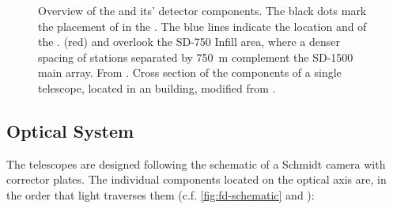 \begin{figure}[t]
  \centering
  \hspace{0.2cm}
  \caption[]{ Overview of the \PAO and its' detector 
  components. The black dots mark the placement of \WCDs in the \SD. The blue 
  lines indicate the location and \FOV of the \FDs. \HE (red) and \CO overlook 
  the SD-750 Infill area, where a denser spacing of stations separated by 
  \SI{750}{\meter} complement the SD-1500 main array. From 
  \cite{vebericIndexHttpWebiapkitedu}.  Cross section 
  of the components of a single telescope, located in an \FD building, modified 
  from \cite{abraham_fluorescence_2010}.}
  \label{fig:pao-images}
\end{figure}


\subsection{Optical System}
\label{ssec:fd-design}

The \FD telescopes are designed following the schematic of a Schmidt camera with 
corrector plates. The individual components located on the optical axis are, in 
the order that light traverses them (c.f. \cref{fig:fd-schematic} and 
\cite{abrahamFluorescenceDetectorPierre2010}):

